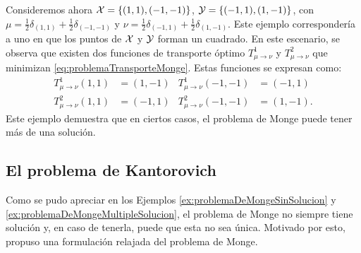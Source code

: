 {{{			\begin{example}\label{ex:problemaDeMongeMultipleSolucion}
				Consideremos ahora $\mathcal{X} = \left\{ (1, 1), (-1, -1) \right\}$, $\mathcal{Y} = \left\{ (-1, 1), (1, -1) \right\}$, con $\mu = \frac{1}{2} \delta_{(1, 1)} + \frac{1}{2} \delta_{(-1, -1)}$ y $\nu = \frac{1}{2} \delta_{(-1, 1)} + \frac{1}{2} \delta_{(1, -1)}$. Este ejemplo correspondería a uno en que los puntos de $\mathcal{X}$ y $\mathcal{Y}$ forman un cuadrado. En este escenario, se observa que existen dos funciones de transporte óptimo $T^1_{\mu\to\nu}$ y $T^2_{\mu\to\nu}$ que minimizan \eqref{eq:problemaTransporteMonge}. Estas funciones se expresan como:
				\begin{align*}
					T^1_{\mu\to\nu}(1, 1) & = (1, -1) & T^1_{\mu\to\nu}(-1, -1) & = (-1, 1)  \\
					T^2_{\mu\to\nu}(1, 1) & = (-1, 1) & T^2_{\mu\to\nu}(-1, -1) & = (1, -1).
				\end{align*}
				Este ejemplo demuestra que en ciertos casos, el problema de Monge puede tener más de una solución.
			\end{example}




		}

		\subsection*{El problema de Kantorovich}
		{
			Como se pudo apreciar en los Ejemplos \ref*{ex:problemaDeMongeSinSolucion} y \ref*{ex:problemaDeMongeMultipleSolucion}, el problema de Monge no siempre tiene solución y, en caso de tenerla, puede que esta no sea única. Motivado por esto, \cite{kantorovich1942translocation} propuso una formulación relajada del problema de Monge.

}}}
